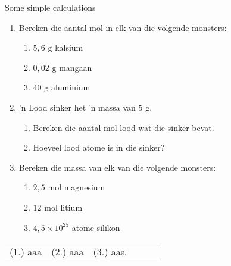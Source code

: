             \begin{exercises} {Some simple calculations}
      \label{m38717*id278090}\begin{enumerate}[noitemsep, label=\textbf{\arabic*}. ] 
            \label{m38717*uid24}\item Bereken die aantal mol in elk van die volgende monsters:
\label{m38717*id278106}\begin{enumerate}[noitemsep, label=\textbf{\alph*}. ] 
            \label{m38717*uid25}\item $5,6 \text{ g}$ kalsium
\label{m38717*uid26}\item $0,02 \text{ g}$ mangaan
\label{m38717*uid27}\item $40\text{ g}$ aluminium
\end{enumerate}
               \label{m38717*uid28}\item 'n Lood sinker het 'n massa van $5 \text{ g}$.
\label{m38717*id278159}\begin{enumerate}[noitemsep, label=\textbf{\alph*}. ] 
            \label{m38717*uid29}\item Bereken die aantal mol lood wat die sinker bevat.
\label{m38717*uid30}\item Hoeveel lood atome is in die sinker?
\end{enumerate}
                \label{m38717*uid31}\item Bereken die massa van elk van die volgende monsters:
\label{m38717*id278201}\begin{enumerate}[noitemsep, label=\textbf{\alph*}. ] 
            \label{m38717*uid32}\item $2,5\text{ mol}$ magnesium
\label{m38717*uid33}\item $12 \text{ mol}$ litium
\label{m38717*uid34}\item $4,5 \times 10^{25}$ atome silikon
\end{enumerate}
                \end{enumerate}
\practiceinfo
\par 
 \par \begin{tabular}[h]{cccccc}
 (1.) aaa  &  (2.) aaa  &  (3.) aaa  & \end{tabular}
\end{exercises}
